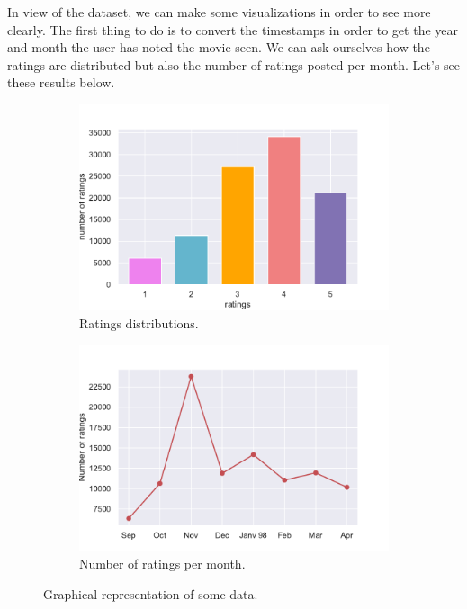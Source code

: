 \documentclass{article}
\begin{document}
In view of the dataset, we can make some visualizations in order to see more clearly.
The first thing to do is to convert the timestamps in order to get the year and month the user has noted the movie  seen.
We can ask ourselves how the ratings are distributed but also the number of ratings posted per month. Let’s see these results below.

\begin{figure}[H]
\centering
\begin{subfigure}{.5\textwidth}
  \centering
  \includegraphics[width=1\linewidth]{./images/distrib_notes.pdf}
  \caption{Ratings distributions.}
  \label{fig:distri_notes}
\end{subfigure}%
\begin{subfigure}{.5\textwidth}
  \centering
  \includegraphics[width=1\linewidth, clip,trim={0cm 0cm 0cm 0.6cm} ]{./images/notes_mois.pdf}
  \caption{Number of ratings per month.}
  \label{fig:mois}
\end{subfigure}
\caption{Graphical representation of some data.}
\label{fig:notes_mois}
\end{figure}
\end{document}
